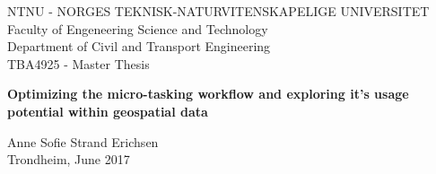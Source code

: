 \begin{titlepage}
\vspace * {-2.5cm}	
	NTNU - NORGES TEKNISK-NATURVITENSKAPELIGE UNIVERSITET\\
	Faculty of Engeneering Science and Technology\\
	Department of Civil and Transport Engineering\\
	TBA4925 - Master Thesis
	
\begin{center}

\vspace * {5cm}
\huge \textbf{Optimizing the micro-tasking workflow and exploring it's usage potential within geospatial data}

\vspace * {2cm}

\large
Anne Sofie Strand Erichsen \\ Trondheim, June 2017
\end{center}

\end{titlepage}
